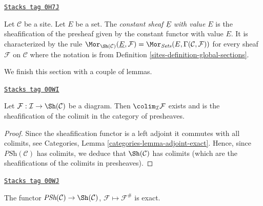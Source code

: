 \begin{example}
\label{sites-example-constant-sheaf}
\href{https://stacks.math.columbia.edu/tag/0H7J}{\texttt{Stacks tag 0H7J}}

Let $\mathcal{C}$ be a site. Let $E$ be a set.
The {\it constant sheaf $\underline{E}$ with value $E$}
is the sheafification of the presheaf given by the constant
functor with value $E$. It is characterized by the rule
$\Mor_{\Sh(\mathcal{C})}(\underline{E}, \mathcal{F}) =
\Mor_{\textit{Sets}}(E, \Gamma(\mathcal{C}, \mathcal{F}))$
for every sheaf $\mathcal{F}$ on $\mathcal{C}$ where the
notation is from Definition \ref{sites-definition-global-sections}.
\end{example}

We finish this section with a couple of lemmas.

\begin{lemma}
\label{sites-lemma-colimit-sheaves}
\href{https://stacks.math.columbia.edu/tag/00WI}{\texttt{Stacks tag 00WI}}


Let $\mathcal{F} : \mathcal{I} \to \Sh(\mathcal{C})$
be a diagram. Then $\colim_\mathcal{I} \mathcal{F}$ exists
and is the sheafification of the colimit in the category of presheaves.
\end{lemma}

\begin{proof}
Since the sheafification functor is a left adjoint it commutes
with all colimits, see Categories,
Lemma \ref{categories-lemma-adjoint-exact}.
Hence, since $\textit{PSh}(\mathcal{C})$ has colimits, we deduce
that $\Sh(\mathcal{C})$ has colimits (which are the
sheafifications of the colimits in presheaves).
\end{proof}

\begin{lemma}
\label{sites-lemma-sheafification-exact}
\href{https://stacks.math.columbia.edu/tag/00WJ}{\texttt{Stacks tag 00WJ}}

The functor $\textit{PSh}(\mathcal{C}) \to \Sh(\mathcal{C})$,
$\mathcal{F} \mapsto \mathcal{F}^\#$ is exact.
\end{lemma}

